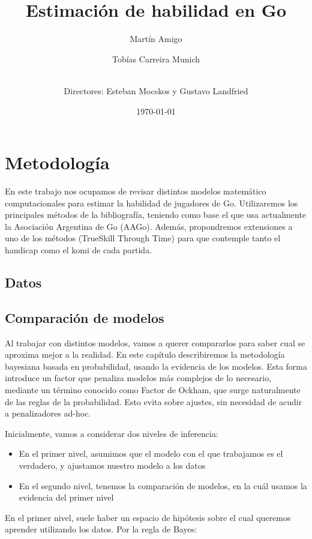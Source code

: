\documentclass[a4paper,10pt]{report}
\title{Estimaci\'on de habilidad en Go}
\author[a]{Martín Amigo}
\author[a]{Tobías Carreira Munich}
\author[a]{\\ \vspace{0.3cm} \normalsize Directores: Esteban Mocskos y Gustavo Landfried}
\date{\today}
\affil[a]{\small Universidad de Buenos Aires. Facultad de Ciencias Exactas y Naturales. Departamento de Computaci\'on. Buenos Aires, Argentina}
\begin{document}
\maketitle

\section*{Metodología}

En este trabajo nos ocupamos de revisar distintos modelos matemático computacionales para estimar la habilidad de jugadores de Go.
Utilizaremos los principales métodos de la bibliografía, teniendo como base el que usa actualmente la Asociación Argentina de Go (AAGo).
Además, propondremos extensiones a uno de los métodos (TrueSkill Through Time) para que contemple tanto el handicap como el komi de cada partida.

\subsection*{Datos}

\subsection*{Comparación de modelos}

Al trabajar con distintos modelos, vamos a querer compararlos para saber cual se aproxima mejor a la realidad.
En este cap\'itulo describiremos la metodolog\'ia bayesiana basada en probabilidad, usando la evidencia de los modelos.
Esta forma introduce un factor que penaliza modelos m\'as complejos de lo necesario, mediante un t\'ermino conocido como Factor de Ockham, que surge naturalmente de las reglas de la probabilidad.
Esto evita sobre ajustes, sin necesidad de acudir a penalizadores ad-hoc.

Inicialmente, vamos a considerar dos niveles de inferencia:

\begin{itemize}
	\item En el primer nivel, asumimos que el modelo con el que trabajamos es el verdadero, y ajustamos nuestro modelo a los datos
	\item En el segundo nivel, tenemos la comparaci\'on de modelos, en la cu\'al usamos la evidencia del primer nivel
\end{itemize}

En el primer nivel, suele haber un espacio de hip\'otesis sobre el cual queremos aprender utilizando los datos.
Por la regla de Bayes:
\end{document}
